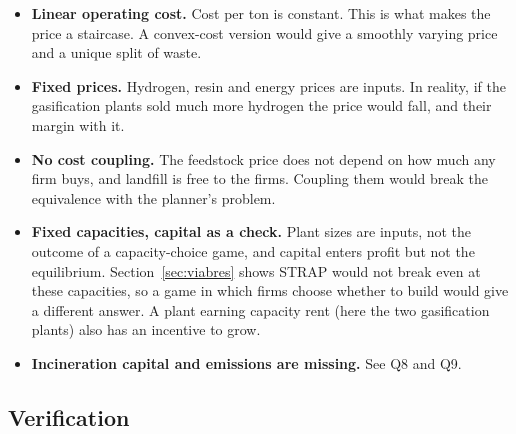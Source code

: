 \documentclass[11pt]{article}
\begin{document}
\begin{itemize}[leftmargin=1.4em,itemsep=0.25em]
  \item \textbf{Linear operating cost.} Cost per ton is constant. This is what makes
        the price a staircase. A convex-cost version would give a smoothly varying
        price and a unique split of waste.
  \item \textbf{Fixed prices.} Hydrogen, resin and energy prices are inputs. In
        reality, if the gasification plants sold much more hydrogen the price would
        fall, and their margin with it.
  \item \textbf{No cost coupling.} The feedstock price does not depend on how much
        any firm buys, and landfill is free to the firms. Coupling them would
        break the equivalence with the planner's problem.
  \item \textbf{Fixed capacities, capital as a check.} Plant sizes are inputs, not the
        outcome of a capacity-choice game, and capital enters profit but not the
        equilibrium. Section~\ref{sec:viabres} shows STRAP would not break even at
        these capacities, so a game in which firms choose whether to build would give
        a different answer. A plant earning capacity rent (here the two gasification
        plants) also has an incentive to grow.
  \item \textbf{Incineration capital and emissions are missing.} See Q8 and Q9.
\end{itemize}

\subsection{Verification}
\end{document}
